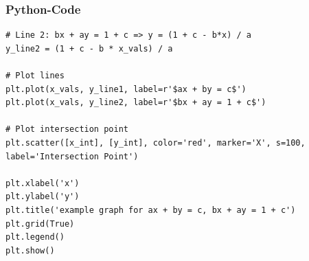 \documentclass{beamer}
\begin{document}
\begin{frame}[fragile]
\frametitle{Python-Code}
\begin{lstlisting}
# Line 2: bx + ay = 1 + c => y = (1 + c - b*x) / a
y_line2 = (1 + c - b * x_vals) / a

# Plot lines
plt.plot(x_vals, y_line1, label=r'$ax + by = c$')
plt.plot(x_vals, y_line2, label=r'$bx + ay = 1 + c$')

# Plot intersection point
plt.scatter([x_int], [y_int], color='red', marker='X', s=100, label='Intersection Point')

plt.xlabel('x')
plt.ylabel('y')
plt.title('example graph for ax + by = c, bx + ay = 1 + c')
plt.grid(True)
plt.legend()
plt.show()
\end{lstlisting}
\end{frame}
\end{document}
